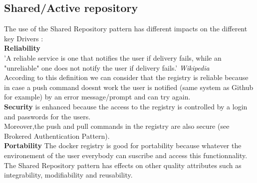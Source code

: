 \subsection{Shared/Active repository} 
The use of the Shared Repository pattern has different impacts on the different key Drivers : \\ 
\textbf{Reliability} \\
'A reliable service is one that notifies the user if delivery fails, while an "unreliable" one does not notify the user if delivery fails.'  \textit{Wikipedia} \\
According to this definition we can consider that the registry is reliable because in case a push command doesnt work the user is notified (same system as Github for example) by an error message/prompt and can try again. \\

\textbf{Security} is enhanced because the access to the registry is controlled by a login and passwords for the users. \\
Moreover,the push and pull commands in the registry are also secure (see Brokered Authentication Pattern). \\
\textbf{Portability} The docker registry is good for portability because whatever the environement of the user everybody can suscribe and access this functionnality.\\

The Shared Repository pattern has effects on other quality attributes such as integrability, modifiability and reusability. 

